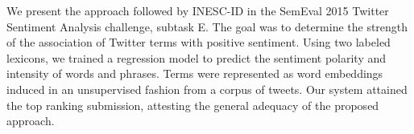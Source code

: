 We present the approach followed by INESC-ID in the SemEval 2015 Twitter Sentiment Analysis challenge, subtask E. The goal was to determine the strength of the association of Twitter terms with positive sentiment. Using two labeled lexicons, we trained a regression model to predict the sentiment polarity and intensity of words and phrases. Terms were represented as word embeddings induced in an unsupervised fashion from a corpus of tweets. Our system attained the top ranking submission, attesting the general adequacy of the proposed approach.
